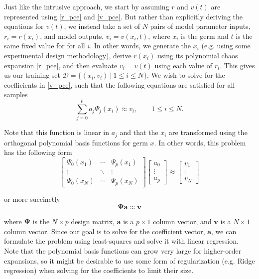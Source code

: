 \documentclass[11pt]{article}
\numberwithin{equation}{section}
\begin{document}
\qquad Just like the intrusive approach, we start by assuming $r$ and $v(t)$ are represented using \eqref{r_pce} and \eqref{v_pce}. But rather than explicitly deriving the equations for $v(t)$, we instead take a set of $N$ pairs of model parameter inputs, $r_i = r(x_i)$, and model outputs, $v_i = v(x_i, t)$, where $x_i$ is the germ and $t$ is the same fixed value for for all $i$. In other words, we generate the $x_i$ (e.g. using some experimental design methodology), derive $r(x_i)$ using its polynomial chaos expansion \eqref{r_pce}, and then evaluate $v_i = v(t)$ using each value of $r_i$. This gives us our training set $\mathcal{D} = \{ (x_i, v_i) \ | \ 1 \leq i \leq N \}$. We wish to solve for the coefficients in \eqref{v_pce}, such that the following equations are satisfied for all samples
\begin{equation}
\sum_{j=0}^{p}  a_j \Psi_j(x_i) \approx v_i, \qquad 1 \leq i \leq N. \label{pce_train} 
\end{equation}

Note that this function is linear in $a_j$ and that the $x_i$ are transformed using the orthogonal polynomial basis functions for germ $x$. In other words, this problem has the following form
\begin{equation}
\begin{bmatrix} \Psi_0(x_1) & \cdots & \Psi_p(x_1) \\ \vdots & \ddots & \vdots \\ \Psi_0(x_N) & \cdots & \Psi_p(x_N) \end{bmatrix}
\begin{bmatrix} a_0 \\  \vdots \\  a_p \end{bmatrix}
\approx
\begin{bmatrix} v_1 \\  \vdots \\  v_N \end{bmatrix}
\end{equation}

or more succinctly
\begin{equation}
\mathbf{\Psi} \mathbf{a} \approx \mathbf{v}
\end{equation}

where $\mathbf{\Psi}$ is the $N \times p$ design matrix, $\mathbf{a}$ is a $p \times 1$ column vector, and $\mathbf{v}$ is a $N \times 1$ column vector. Since our goal is to solve for the coefficient vector, $\mathbf{a}$, we can formulate the problem using least-squares and solve it with linear regression. Note that the polynomial basis functions can grow very large for higher-order expansions, so it might be desirable to use some form of regularization (e.g. Ridge regression) when solving for the coefficients to limit their size.
\end{document}
